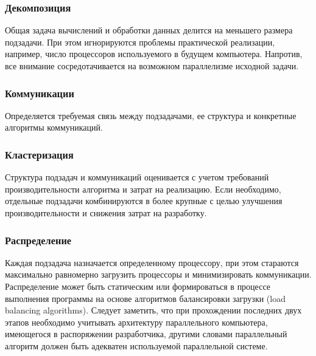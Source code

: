 \subsubsection{Декомпозиция} 
Общая задача вычислений и обработки данных делится на меньшего размера подзадачи. При этом игнорируются проблемы практической реализации, например, число процессоров используемого в будущем компьютера. Напротив, все внимание сосредотачивается на возможном параллелизме исходной задачи. 
\subsubsection{Коммуникации}
Определяется требуемая связь между подзадачами, ее структура и конкретные алгоритмы коммуникаций. 
\subsubsection{Кластеризация} 
Структура подзадач и коммуникаций оценивается с учетом требований производительности алгоритма и затрат на реализацию. Если необходимо, отдельные подзадачи комбинируются в более крупные с целью улучшения производительности и снижения затрат на разработку. 
\subsubsection{Распределение} 
Каждая подзадача назначается определенному процессору, при этом стараются максимально равномерно загрузить процессоры и минимизировать коммуникации. Распределение может быть статическим или формироваться в процессе выполнения программы на основе алгоритмов балансировки загрузки (load balancing algorithms). 
Следует заметить, что при прохождении последних двух этапов необходимо учитывать архитектуру параллельного компьютера, имеющегося в распоряжении разработчика, другими словами параллельный алгоритм должен быть адекватен используемой параллельной системе. 

